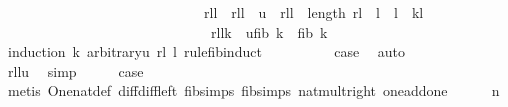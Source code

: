 \begin{isabellebody}
\ \ \ \ \ \ \ \ \ \ \ \ \ \ \ \ \ \ \ \ \ \ \ \ \ \ \ \ \ rl{\isacharbang}{\isacharparenleft}l{\isacharminus}{}{\isacharparenright}\ {\isacharless}\ rl{\isacharbang}{\isacharparenleft}l{\isacharminus}{}{\isacharparenright}\ {\isasymLongrightarrow}\ u\ {\isasymle}\ rl{\isacharbang}{\isacharparenleft}l{\isacharminus}{}{\isacharparenright}\ {\isasymLongrightarrow}\ length\ rl\ {\isacharequal}\ l\ {\isasymLongrightarrow}\ l{\isasymge}{}\ {\isasymLongrightarrow}\ k{\isacharless}l\ \isanewline
\ \ \ \ \ \ \ \ \ \ \ \ \ \ \ \ \ \ \ \ \ \ \ \ \ \ \ \ \ {\isasymLongrightarrow}\ rl{\isacharbang}{\isacharparenleft}l{\isacharminus}{}{\isacharminus}k{\isacharparenright}\ {\isasymge}\ u{\isacharasterisk}{\isacharparenleft}fib\ k{\isacharparenright}\ {\isacharplus}\ {\isacharparenleft}fib{}\ k{\isacharparenright}{\isachardoublequoteclose}\isanewline
%
\isadelimproof
%
\endisadelimproof
%
\isatagproof
{}\isamarkupfalse%
\ {\isacharparenleft}induction\ k\ arbitrary{\isacharcolon}u\ rl\ l\ rule{\isacharcolon}fib{}{\isachardot}induct{\isacharparenright}\isanewline
\ \ \isamarkupfalse%
\ {}\isanewline
\ \ \isamarkupfalse%
\ \isamarkupfalse%
\ {\isacharquery}case\ \isamarkupfalse%
\ auto\isanewline
{}\isamarkupfalse%
\isanewline
\ \ \isamarkupfalse%
\ {}\isanewline
\ \ \isamarkupfalse%
\ \isamarkupfalse%
\ {\isachardoublequoteopen}rl{\isacharbang}{\isacharparenleft}l{\isacharminus}{}{\isacharparenright}{\isasymge}u{\isacharplus}{}{\isachardoublequoteclose}\ \isamarkupfalse%
\ simp\isanewline
\ \ \isamarkupfalse%
\ \isamarkupfalse%
\ {\isacharquery}case\isanewline
\ \ \ \ \isamarkupfalse%
\ {\isacharparenleft}metis\ One{\isacharunderscore}nat{\isacharunderscore}def\ diff{\isacharunderscore}diff{\isacharunderscore}left\ fib{\isachardot}simps{\isacharparenleft}{}{\isacharparenright}\ fib{}{\isachardot}simps{\isacharparenleft}{}{\isacharparenright}\ nat{\isacharunderscore}mult{\isacharunderscore}{}{\isacharunderscore}right\ one{\isacharunderscore}add{\isacharunderscore}one{\isacharparenright}\ \isanewline
{}\isamarkupfalse%
\isanewline
\ \ \isamarkupfalse%
\ {\isacharparenleft}{}\ n{\isacharparenright}\isanewline
\ \ \isamarkupfalse%

\end{isabellebody}
